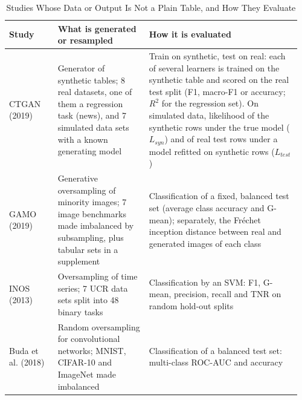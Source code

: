 \begin{table}[t]
  \caption{Studies Whose Data or Output Is Not a Plain Table, and How They Evaluate}
  \label{tab:empirical-tasks}
  \footnotesize
  \setlength{\tabcolsep}{4pt}
  \begin{tabular}{@{}>{\raggedright\arraybackslash}p{0.16\linewidth}>{\raggedright\arraybackslash}p{0.3\linewidth}>{\raggedright\arraybackslash}p{0.5\linewidth}@{}}
    \toprule
    Study & What is generated or resampled & How it is evaluated\\
    \midrule
    CTGAN (2019)~\parencite{xu2019ctgan} & Generator of synthetic tables; 8 real datasets, one of them a regression task (news), and 7 simulated data sets with a known generating model & Train on synthetic, test on real: each of several learners is trained on the synthetic table and scored on the real test split (F1, macro-F1 or accuracy; $R^2$ for the regression set). On simulated data, likelihood of the synthetic rows under the true model ($L_{syn}$) and of real test rows under a model refitted on synthetic rows ($L_{test}$)\\
    GAMO (2019)~\parencite{mullick2019gamo} & Generative oversampling of minority images; 7 image benchmarks made imbalanced by subsampling, plus tabular sets in a supplement & Classification of a fixed, balanced test set (average class accuracy and G-mean); separately, the Fréchet inception distance between real and generated images of each class\\
    INOS (2013)~\parencite{cao2013inos} & Oversampling of time series; 7 UCR data sets split into 48 binary tasks & Classification by an SVM: F1, G-mean, precision, recall and TNR on random hold-out splits\\
    Buda et al. (2018)~\parencite{buda2018systematic} & Random oversampling for convolutional networks; MNIST, CIFAR-10 and ImageNet made imbalanced & Classification of a balanced test set: multi-class ROC-AUC and accuracy\\
    \bottomrule
  \end{tabular}
\end{table}
